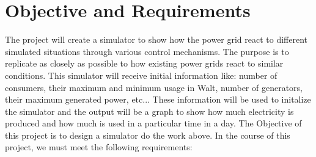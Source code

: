 \section{Objective and Requirements}
The project will create a simulator to show how the power grid react to different simulated situations through various control mechanisms. The purpose is to replicate as closely as possible to how existing power grids react to similar conditions.
This simulator will receive initial information like: number of consumers, their maximum and minimum usage in Walt, number of generators, their maximum generated power, etc...
These information will be used to initalize the simulator and the output will be a graph to show how much electricity is produced and how much is used in a particular time in a day.
The Objective of this project is to design a simulator do the work above.
In the course of this project, we must meet the following requirements:
\newpage
